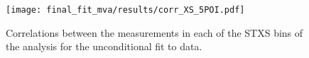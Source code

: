 \begin{figure}[hb]
  \centering
  \texttt{[image: final\_fit\_mva/results/corr\_XS\_5POI.pdf]}
  \caption{Correlations between the measurements in each of the STXS bins of the
  analysis for the unconditional fit to data.}
  \label{fig:5POI-corr}
\end{figure}